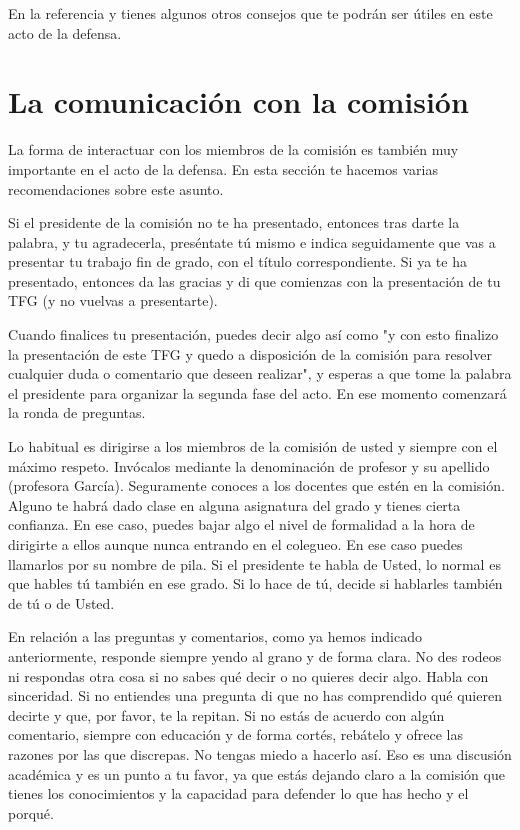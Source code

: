 En la referencia \cite{vallejo2009defensa} y tienes algunos otros consejos que te podrán ser útiles en este acto de la defensa.


\section{La comunicación con la comisión}

La forma de interactuar con los miembros de la comisión es también muy importante en el acto de la defensa. En esta sección te hacemos varias recomendaciones sobre este asunto.

Si el presidente de la comisión no te ha presentado, entonces tras darte la palabra, y tu agradecerla, preséntate tú mismo e indica seguidamente que vas a presentar tu trabajo fin de grado, con el título correspondiente. Si ya te ha presentado, entonces da las gracias y di que comienzas con la presentación de tu TFG (y no vuelvas a presentarte). 

Cuando finalices tu presentación, puedes decir algo así como "y con esto finalizo la presentación de este TFG y quedo a disposición de la comisión para resolver cualquier duda o comentario que deseen realizar", y esperas a que tome la palabra el presidente para organizar la segunda fase del acto. En ese momento comenzará la ronda de preguntas. 

Lo habitual es dirigirse a los miembros de la comisión de usted y siempre con el máximo respeto. Invócalos mediante la denominación de profesor y su apellido
(profesora García). Seguramente conoces a los docentes que estén en la comisión. Alguno te habrá dado clase en alguna asignatura del grado y tienes cierta confianza. En ese caso, puedes bajar algo el nivel de formalidad a la hora de dirigirte a ellos aunque nunca entrando en el colegueo. En ese caso puedes llamarlos por su nombre de pila. Si el presidente te habla de Usted, lo normal es que hables tú también en ese grado. Si lo hace de tú, decide si hablarles también de tú o de Usted. 

En relación a las preguntas y comentarios, como ya hemos indicado anteriormente, responde siempre yendo al grano y de forma clara. No des rodeos ni respondas otra cosa si no sabes qué decir o no quieres decir algo. Habla con sinceridad. Si no entiendes una pregunta di que no has comprendido qué quieren decirte y que, por favor, te la repitan. Si no estás de acuerdo con algún comentario, siempre con educación y de forma cortés, rebátelo y ofrece las razones por las que discrepas. No tengas miedo a hacerlo así. Eso es una discusión académica y es un punto a tu favor, ya que estás dejando claro a la comisión que tienes los conocimientos y la capacidad para defender lo que has hecho y el porqué.

